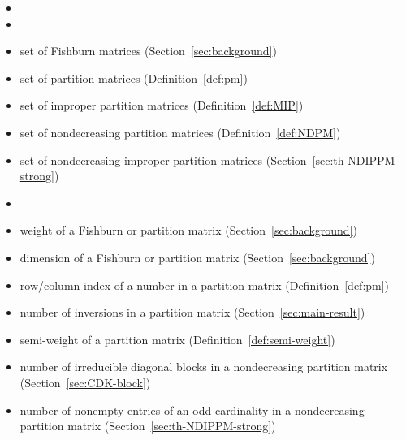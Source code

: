 \documentclass[12pt,reqno]{amsart}
\numberwithin{equation}{section}
\theoremstyle{theorem}
\theoremstyle{definition}
\theoremstyle{named}
\newcommand{\MatF}{\operatorname{FM}}
\newcommand{\MatP}{\operatorname{PM}}
\newcommand{\col}{\operatorname{col}}
\newcommand{\row}{\operatorname{row}}
\newcommand{\inv}{\operatorname{inv}}
\newcommand{\IPPM}{\operatorname{IPPM}}
\newcommand{\NDIPPM}{\operatorname{NDIPPM}}
\newcommand{\NDPM}{\operatorname{NDPM}}
\newcommand{\odd}{\operatorname{odd}}
\newcommand{\blk}{\operatorname{blk}}
\begin{document}
\begin{itemize}[
	itemindent=0pt, 
	leftmargin=2.75cm, 
	topsep=6pt, 
	itemsep=2pt,
	labelsep=0pt, 
	labelwidth=2.75cm,
	align=left
	]
	
	\item[\textbf{\textsf{Matrices}}] 
	
	\item[$\clubsuit$ \textit{Sets}]
	
	\item[$\MatF$] set of Fishburn matrices (Section~\ref{sec:background})
	
	\item[$\MatP$] set of partition matrices (Definition~\ref{def:pm})
	
	\item[$\IPPM$] set of improper partition matrices (Definition~\ref{def:MIP})
	
	\item[$\NDPM$] set of nondecreasing partition matrices (Definition~\ref{def:NDPM})
	
	\item[$\NDIPPM$] set of nondecreasing improper partition matrices (Section~\ref{sec:th-NDIPPM-strong})
	
	\item[$\blacklozenge$ \textit{Statistics}]
	
	\item[$w$] weight of a Fishburn or partition matrix (Section~\ref{sec:background})
	
	\item[$\dim$] dimension of a Fishburn or partition matrix (Section~\ref{sec:background})
	
	\item[$\row$, $\col$] row/column index of a number in a partition matrix (Definition~\ref{def:pm})
	
	\item[$\inv$] number of inversions in a partition matrix (Section~\ref{sec:main-result})
	
	\item[$v$] semi-weight of a partition matrix (Definition~\ref{def:semi-weight})
	
	\item[$\blk$] number of irreducible diagonal blocks in a nondecreasing partition matrix (Section~\ref{sec:CDK-block})
	
	\item[$\odd$] number of nonempty entries of an odd cardinality in a nondecreasing partition matrix (Section~\ref{sec:th-NDIPPM-strong})
	

\end{itemize}
\end{document}
